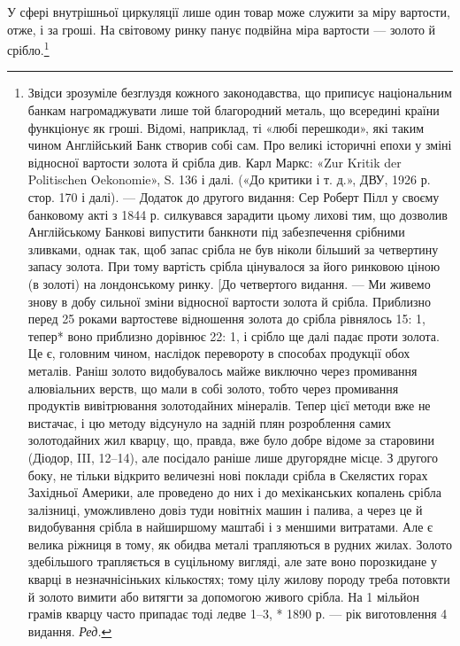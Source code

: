 У сфері внутрішньої циркуляції лише один товар може служити
за міру вартости, отже, і за гроші. На світовому ринку
панує подвійна міра вартости — золото й срібло.\footnote{
Звідси зрозуміле безглуздя кожного законодавства, що приписує
національним банкам нагромаджувати лише той благородний металь,
що всередині країни функціонує як гроші. Відомі, наприклад, ті «любі
перешкоди», які таким чином Англійський Банк створив собі сам. Про
великі історичні епохи у зміні відносної вартости золота й срібла див.
Карл Маркс: «Zur Kritik der Politischen Oekonomie», S. 136 і далі. («До
критики і т. д.», ДВУ, 1926 р. стор. 170 і далі). — Додаток до другого видання:
Сер Роберт Пілл у своєму банковому акті з 1844 р. силкувався зарадити
цьому лихові тим, що дозволив Англійському Банкові випустити банкноти
під забезпечення срібними зливками, однак так, щоб запас срібла
не був ніколи більший за четвертину запасу золота. При тому вартість
срібла цінувалося за його ринковою ціною (в золоті) на лондонському
ринку. [До четвертого видання. — Ми живемо знову в добу сильної зміни
відносної вартости золота й срібла. Приблизно перед 25 роками вартостеве
відношення золота до срібла рівнялось 15: 1, тепер* воно приблизно
дорівнює 22: 1, і срібло ще далі падає проти золота. Це є, головним чином,
наслідок перевороту в способах продукції обох металів. Раніш золото
видобувалось майже виключно через промивання алювіальних
верств, що мали в собі золото, тобто через промивання продуктів вивітрювання
золотодайних мінералів. Тепер цієї методи вже не вистачає,
і цю методу відсунуло на задній плян розроблення самих золотодайних
жил кварцу, що, правда, вже було добре відоме за старовини (Діодор, III,
12--14), але посідало раніше лише другорядне місце. З другого боку, не
тільки відкрито величезні нові поклади срібла в Скелястих горах Західньої
Америки, але проведено до них і до мехіканських копалень срібла
залізниці, уможливлено довіз туди новітніх машин і палива, а через це
й видобування срібла в найширшому маштабі і з меншими витратами.
Але є велика ріжниця в тому, як обидва металі трапляються в рудних
жилах. Золото здебільшого трапляється в суцільному вигляді, але зате воно
порозкидане у кварці в незначнісіньких кількостях; тому цілу жилову
породу треба потовкти й золото вимити або витягти за допомогою живого
срібла. На 1 мільйон грамів кварцу часто припадає тоді ледве 1--3,
* 1890 р. — рік виготовлення 4 видання. \emph{Ред.}
}


